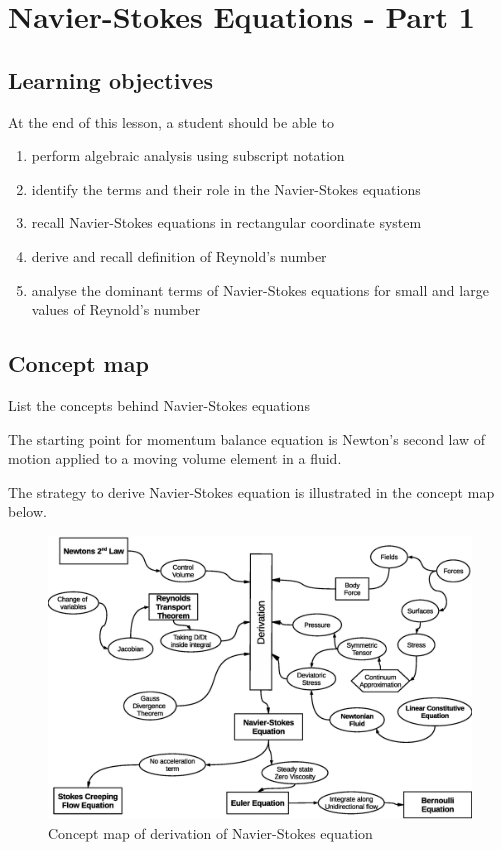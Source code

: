 \chapter{Navier-Stokes Equations - Part 1}
\label{ch:nsderive1}

\section{Learning objectives}

At the end of this lesson, a student should be able to
\begin{enumerate}
\item perform algebraic analysis using subscript notation
\item identify the terms and their role in the Navier-Stokes equations
\item recall Navier-Stokes equations in rectangular coordinate system
\item derive and recall definition of Reynold's number
\item analyse the dominant terms of Navier-Stokes equations for small and large values of Reynold's number
\end{enumerate}

\section{Concept map}

\begin{lo2}
  List the concepts behind Navier-Stokes equations
\end{lo2}

The starting point for momentum balance equation is Newton's second law of motion applied to a moving volume element in a fluid.


The strategy to derive Navier-Stokes equation  is illustrated in the concept map below.

\begin{figure}[h]
 \centering
 \includegraphics[width=6 in]{images/c09-NavierStokesFlowChart2.eps}
 \caption{Concept map of derivation of Navier-Stokes equation}
 \label{nsconceptmap}
\end{figure}


